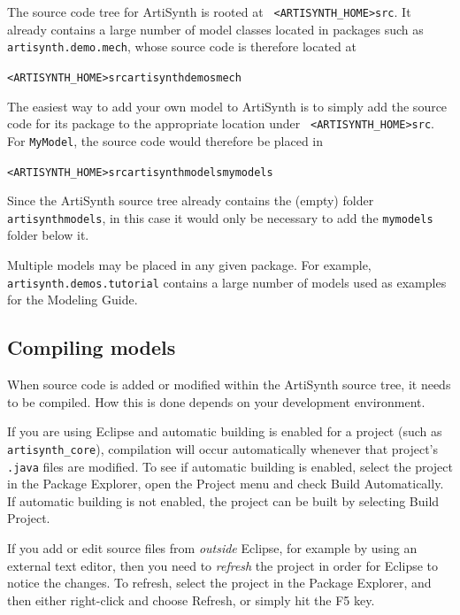 The source code tree for ArtiSynth is rooted at {\tt
<ARTISYNTH\_HOME>\SEP src}. It already contains a large number of
model classes located in packages such as {\tt
artisynth.demo.mech}, whose source code is therefore located at

{\tt <ARTISYNTH\_HOME>\SEP src\SEP artisynth\SEP demos\SEP mech}

The easiest way to add your own model to ArtiSynth is to simply add
the source code for its package to the appropriate location under {\tt
<ARTISYNTH\_HOME>\SEP src}. For {\tt MyModel}, the source code would
therefore be placed in

{\tt <ARTISYNTH\_HOME>\SEP src\SEP artisynth\SEP models\SEP mymodels}

Since the ArtiSynth source tree already contains the (empty) folder
{\tt artisynth\SEP models}, in this case it would only be necessary to
add the {\tt mymodels} folder below it.

\begin{sideblock}
Multiple models may be placed in any given package. For example, {\tt
artisynth.demos.tutorial} contains a large number of models used as
examples for the Modeling Guide.
\end{sideblock}

\subsection{Compiling models}

When source code is added or modified within the ArtiSynth source
tree, it needs to be compiled. How this is done depends on your
development environment.

If you are using Eclipse and automatic building is enabled for a
project (such as {\tt artisynth\_core}), compilation will occur
automatically whenever that project's {\tt .java} files are
modified. To see if automatic building is enabled, select the project
in the Package Explorer, open the {\sf Project} menu and check {\sf
Build Automatically}. If automatic building is not enabled, the
project can be built by selecting {\sf Build Project}.

\begin{sideblock}
If you add or edit source files from {\it outside} Eclipse, for
example by using an external text editor, then you need to {\it
refresh} the project in order for Eclipse to notice the changes.  To
refresh, select the project in the Package Explorer, and then either
right-click and choose {\sf Refresh}, or simply hit the {\sf F5} key.
\end{sideblock}

